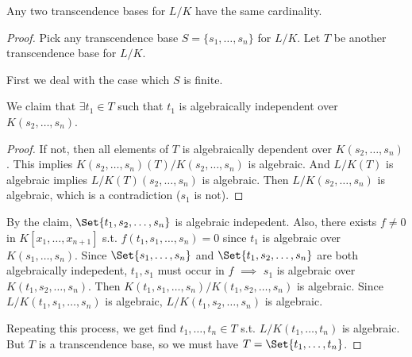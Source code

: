 \begin{theorem}
  Any two transcendence bases for $L/K$ have the same cardinality.

  \begin{proof}
    Pick any transcendence base $S = \{s_1, \dots, s_n\}$ for $L/K$.
    Let $T$ be another transcendence base for $L/K$.

    First we deal with the case which $S$ is finite.

    We claim that $\exists t_1 \in T$ such that
    $t_1$ is algebraically independent over $K(s_2, \dots, s_n)$.
    \begin{proof}
      If not, then all elements of $T$ is algebraically dependent over $K(s_2, \dots, s_n)$.
      This implies $K(s_2, \dots, s_n)(T) / K(s_2, \dots, s_n)$ is algebraic.
      And $L/K(T)$ is algebraic implies $L/K(T)(s_2,\dots,s_n)$ is algebraic.
      Then $L/K(s_2, \dots, s_n)$ is algebraic, which is a contradiction ($s_1$ is not).
    \end{proof}
    By the claim, $\Set{t_1, s_2, \dots, s_n}$ is algebraic indepedent.
    Also, there exists $f \ne 0$ in $K[x_1, \dots, x_{n+1}]$ s.t.
    $f(t_1, s_1, \dots, s_n) = 0$ since $t_1$ is algebraic over $K(s_1, \dots, s_n)$.
    Since $\Set{s_1, \dots, s_n}$ and $\Set{t_1, s_2, \dots, s_n}$ are both
    algebraically indepedent, $t_1, s_1$ must occur in $f$ $\implies$
    $s_1$ is algebraic over $K(t_1, s_2, \dots, s_n)$.
    Then $K(t_1, s_1, \dots, s_n) / K(t_1, s_2, \dots, s_n)$ is algebraic.
    Since $L/K(t_1, s_1, \dots, s_n)$ is algebraic, $L/K(t_1, s_2, \dots, s_n)$
    is algebraic.

    Repeating this process, we get find $t_1, \dots, t_n \in T$ s.t.
    $L/K(t_1, \dots, t_n)$ is algebraic. But $T$ is a transcendence base,
    so we must have $T = \Set{t_1, \dots, t_n}$.


\end{proof}
\end{theorem}
